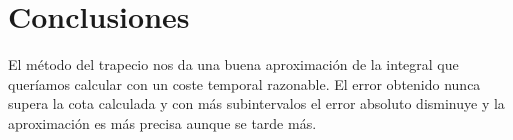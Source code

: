 \section{Conclusiones}
\label{4:sec:1}
El m\'etodo del trapecio nos da una buena aproximaci\'on de la integral que quer\'iamos calcular con un coste temporal razonable. El error obtenido nunca supera la cota calculada y con m\'as subintervalos el error absoluto disminuye y la aproximaci\'on es m\'as precisa aunque se tarde m\'as.
